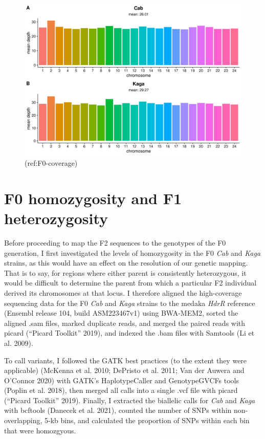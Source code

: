 \documentclass[
]{book}
\begin{document}
\begin{figure}
\includegraphics[width=1\linewidth]{figs/somites/F0_coverage} \caption{(ref:F0-coverage)}\label{fig:F0-coverage}
\end{figure}

\hypertarget{f0-homozygosity-and-f1-heterozygosity}{%
\section{F0 homozygosity and F1 heterozygosity}\label{f0-homozygosity-and-f1-heterozygosity}}

Before proceeding to map the F2 sequences to the genotypes of the F0 generation, I first investigated the levels of homozygosity in the F0 \emph{Cab} and \emph{Kaga} strains, as this would have an effect on the resolution of our genetic mapping. That is to say, for regions where either parent is consistently heterozygous, it would be difficult to determine the parent from which a particular F2 individual derived its chromosomes at that locus. I therefore aligned the high-coverage sequencing data for the F0 \emph{Cab} and \emph{Kaga} strains to the medaka \emph{HdrR} reference (Ensembl release 104, build ASM223467v1) using BWA-MEM2, sorted the aligned .sam files, marked duplicate reads, and merged the paired reads with picard ({``Picard Toolkit''} 2019), and indexed the .bam files with Samtools (Li et al. 2009).

To call variants, I followed the GATK best practices (to the extent they were applicable) (McKenna et al. 2010; DePristo et al. 2011; Van der Auwera and O'Connor 2020) with GATK's HaplotypeCaller and GenotypeGVCFs tools (Poplin et al. 2018), then merged all calls into a single .vcf file with picard ({``Picard Toolkit''} 2019). Finally, I extracted the biallelic calls for \emph{Cab} and \emph{Kaga} with bcftools (Danecek et al. 2021), counted the number of SNPs within non-overlapping, 5-kb bins, and calculated the proportion of SNPs within each bin that were homozgyous.
\end{document}
